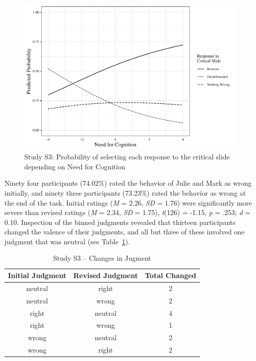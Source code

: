 \documentclass[
  american,
  man,floatsintext]{apa7}
\begin{document}
\begin{figure}[!h]
\includegraphics{Supplementary_files/figure-latex/S3ggplotlogit3-1} \caption{Study S3: Probability of selecting each response to the critical slide depending on Need for Cognition}\label{fig:S3ggplotlogit3}
\end{figure}

Ninety four participants (74.02\%) rated the behavior of Julie and Mark as wrong initially, and ninety three participants (73.23\%) rated the behavior as wrong at the end of the task. Initial ratings (\emph{M} = 2.26, \emph{SD} = 1.76) were significantly more severe than revised ratings (\emph{M} = 2.34, \emph{SD} = 1.75), \emph{t}(126) = -1.15, \emph{p} = .253; \emph{d} = 0.10. Inspection of the binned judgments revealed that thirteen participants changed the valence of their judgments, and all but three of these involved one judgment that was neutral (see Table~\ref{tab:tabS3change}).

\begin{table}[tbp]

\begin{center}
\begin{threeparttable}

\caption{\label{tab:tabS3change}Study S3 – Changes in Jugment}

\begin{tabular}{ccc}
\toprule
Initial Judgment & \multicolumn{1}{c}{Revised Judgment} & \multicolumn{1}{c}{Total Changed}\\
\midrule
neutral & right & 2\\
neutral & wrong & 2\\
right & neutral & 4\\
right & wrong & 1\\
wrong & neutral & 2\\
wrong & right & 2\\
\bottomrule
\end{tabular}

\end{threeparttable}
\end{center}

\end{table}
\end{document}
